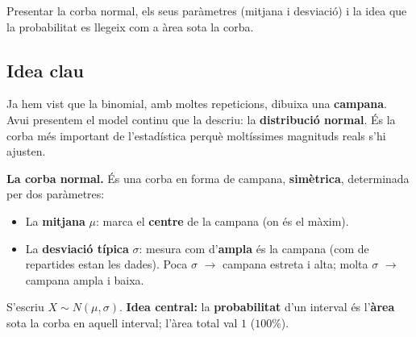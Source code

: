 %
{Presentar la corba normal, els seus paràmetres (mitjana i desviació) i la idea que la probabilitat es llegeix com a àrea sota la corba.}

\subsection{Idea clau}

Ja hem vist que la binomial, amb moltes repeticions, dibuixa una \textbf{campana}. Avui
presentem el model continu que la descriu: la \textbf{distribució normal}. És la corba
més important de l'estadística perquè moltíssimes magnituds reals s'hi ajusten.

\begin{idea}
\textbf{La corba normal.} És una corba en forma de campana, \textbf{simètrica},
determinada per dos paràmetres:
\begin{itemize}[leftmargin=1.4em, itemsep=2pt]
  \item La \textbf{mitjana} $\mu$: marca el \textbf{centre} de la campana (on és el
        màxim).
  \item La \textbf{desviació típica} $\sigma$: mesura com d'\textbf{ampla} és la campana
        (com de repartides estan les dades). Poca $\sigma$ $\to$ campana estreta i alta;
        molta $\sigma$ $\to$ campana ampla i baixa.
\end{itemize}
S'escriu $X\sim N(\mu,\sigma)$. \textbf{Idea central:} la \textbf{probabilitat} d'un
interval és l'\textbf{àrea} sota la corba en aquell interval; l'àrea total val $1$
($100\%$).
\end{idea}

\begin{center}

\end{center}

